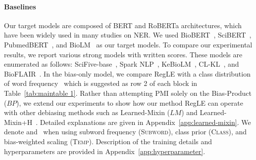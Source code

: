 \documentclass[11pt]{article}
\newcommand{\cmark}{\ding{51}}\newcommand{\xmark}{\ding{55}}\newcommand{\cross}{\ding{61}}\newcommand{\mb}[1]{\textcolor{red}{#1}}
\begin{document}
\paragraph{Baselines}
Our target models are composed of BERT and RoBERTa architectures, which have been widely used in many studies on NER.
We used BioBERT~\cite{lee2020biobert}, SciBERT~\cite{beltagy2019scibert}, PubmedBERT~\cite{liu2020domain}, and BioLM~\cite{lewis2020pretrained} as our target models. 
To compare our experimental results, we report various strong models with written scores.
These models are enumerated as follows: SciFive-base~\cite{phan2021scifive}, Spark NLP~\cite{kocaman2021spark}, KeBioLM~\cite{yuan2021improving}, CL-KL~\cite{wang2021improving}, and  BioFLAIR~\cite{sharma2019bioflair}.
In the bias-only model, we compare RegLE with a class distribution of word frequency~\cite{kim2021your} which is suggested as row 2 of each block in Table~\ref{tab:maintable 1}.
Rather than attempting PMI solely on the Bias-Product ($BP$), we extend our experiments to show how our method RegLE can operate with other debiasing methods such as Learned-Mixin ($LM$) and Learned-Mixin+H~\cite{clark2019don}. 
Detailed explanations are given in Appendix~\ref{app:learned-mixin}.
We denote \cmark and \xmark ~when using subword frequency (\textsc{Subword}), class prior (\textsc{Class}), and bias-weighted scaling (\textsc{Temp}).
Description of the training details and hyperparameters are provided in Appendix~\ref{app:hyperparameter}.
\end{document}
